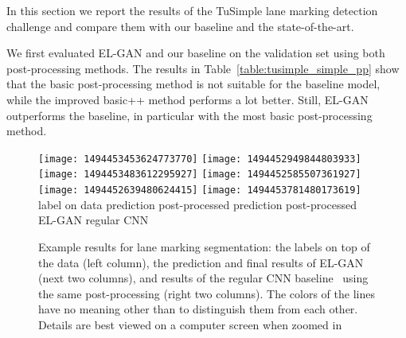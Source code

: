 \documentclass{article} \usepackage{nips13submit_e,times}
\newcommand{\elgan}{\mbox{EL-GAN}}
\begin{document}
In this section we report the results of the TuSimple lane marking detection challenge and compare them with our baseline and the state-of-the-art.



We first evaluated \elgan{} and our baseline on the validation set using both post-processing methods.
The results in Table~\ref{table:tusimple_simple_pp} show that the basic post-processing method is not suitable for the baseline model, while the improved basic++ method performs a lot better.
Still, \elgan{} outperforms the baseline, in particular with the most basic post-processing method.

\begin{figure}[!t]
  {
  \centering
  \texttt{[image: 1494453453624773770]}
  \texttt{[image: 1494452949844803933]}
  \texttt{[image: 1494453483612295927]}
  \texttt{[image: 1494452585507361927]}
  \texttt{[image: 1494452639480624415]}
  \texttt{[image: 1494453781480173619]}
  }
  {\phantom{} \hspace{1.5em} label on data \hspace{2.5em} prediction \hspace{2.5em} post-processed \hspace{2em} prediction \hspace{2.5em} post-processed \hspace{0em}}
  \\
  {\phantom{} \hspace{14em} \elgan{} \hspace{11em} regular CNN \hspace{1em}}
  \caption{Example results for lane marking segmentation: the labels on top of the data (left column), the prediction and final results of \elgan{} (next two columns), and results of the regular CNN baseline~\cite{jegou2017the} using the same post-processing (right two columns). The colors of the lines have no meaning other than to distinguish them from each other.
  Details are best viewed on a computer screen when zoomed in
  }
  \label{fig:tusimple_simple_pp}
\end{figure}
\end{document}
